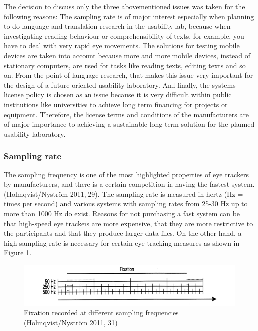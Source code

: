 \documentclass[output=paper]{langsci/langscibook}
\begin{document}
The decision to discuss only the three abovementioned issues was taken for the following reasons: The sampling rate is of major interest especially when planning to do language and translation research in the usability lab, because when investigating reading behaviour or comprehensibility of texts, for example, you have to deal with very rapid eye movements. The solutions for testing mobile devices are taken into account because more and more mobile devices, instead of stationary computers, are used for tasks like reading texts, editing texts and so on. From the point of language research, that makes this issue very important for the design of a future-oriented usability laboratory. And finally, the systems license policy is chosen as an issue because it is very difficult within public institutions like universities to achieve long term financing for projects or equipment. Therefore, the license terms and conditions of the manufacturers are of major importance to achieving a sustainable long term solution for the planned usability laboratory.


\subsubsection{Sampling rate}

{\textquotedbl}The sampling frequency is one of the most highlighted properties of eye trackers by manufacturers, and there is a certain competition in having the fastest system.{\textquotedbl} (Holmqvist/Nyström 2011, 29). The sampling rate is measured in hertz (Hz = times per second) and various systems with sampling rates from 25-30 Hz up to more than 1000 Hz do exist. Reasons for not purchasing a fast system can be that high-speed eye trackers are more expensive, that they are more restrictive to the participants and that they produce larger data files. On the other hand, a high sampling rate is necessary for certain eye tracking measures as shown in Figure \ref{fig:4}.

\begin{figure}[h]
 \includegraphics[width=\textwidth]{figures/Roesener4.png}
 \caption{Fixation recorded at different sampling frequencies (Holmqvist/Nyström 2011, 31)}
 \label{fig:4}
\end{figure} 
\end{document}
